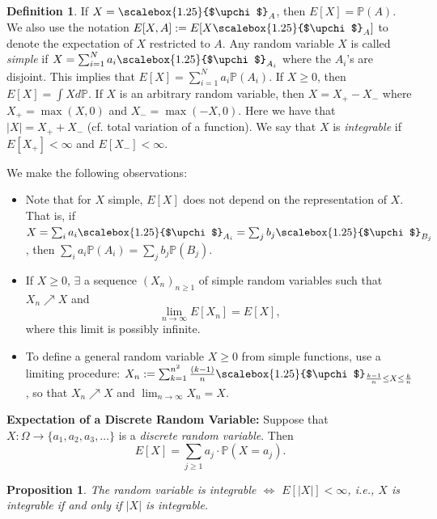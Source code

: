 \documentclass[12pt,reqno]{article}
\renewcommand{\emph}[1]{\textit{#1}}
\theoremstyle{plain}
\newtheorem{prop}[theorem]{Proposition}
\theoremstyle{definition}
\newtheorem{definition}[theorem]{Definition}
\newcommand{\PP}[1]{\ensuremath{\mathbb{P}\left(#1\right)}}
\renewcommand{\chi}{\scalebox{1.25}{$\upchi$}}
\begin{document}
\begin{definition}
If $X = \chi_A$, then $E[X] = \mathbb{P}(A)$. We also use the notation 
$E[X,A] := E[X \chi_A]$ to denote the expectation of $X$ restricted to $A$. 
Any random variable $X$ is 
called \emph{simple} if $X = \sum_{i=1}^N a_i \chi_{A_i}$ where the 
$A_i$'s are disjoint. This implies that 
$E[X] = \sum_{i=1}^N a_i \mathbb{P}(A_i)$. 
If $X \geq 0$, then $E[X] = \int X d\mathbb{P}$. 
If $X$ is an arbitrary random variable, then $X = X_{+} - X_{-}$ where 
$X_{+} = \max(X, 0)$ and $X_{-} = \max(-X, 0)$. Here we have that 
$|X| = X_{+} + X_{-}$ (cf. total variation of a function). 
We say that $X$ is \emph{integrable} if $E[X_{+}] < \infty$ and 
$E[X_{-}] < \infty$. 
\end{definition} 
We make the following observations: 
\begin{itemize} 

\item Note that for $X$ simple, $E[X]$ does not depend on the 
     representation of $X$. That is, if 
     $X = \sum_i a_i \chi_{A_i} = \sum_j b_j \chi_{B_j}$, then 
     $\sum_i a_i \mathbb{P}(A_i) = \sum_j b_j \mathbb{P}(B_j)$. 
\item If $X \geq 0$, $\exists$ a sequence $(X_n)_{n \geq 1}$ of simple 
     random variables such that $X_n \nearrow X$ and 
     \[
     \lim_{n \rightarrow \infty} E[X_n] = E[X], 
     \]
     where this limit is possibly infinite. 
\item To define a general random variable $X \geq 0$ from simple functions, 
     use a limiting procedure: 
     $X_n := \sum_{k=1}^{n^2} \frac{(k-1)}{n} 
      \chi_{\frac{k-1}{n} \leq X \leq \frac{k}{n}}$, so that 
     $X_n \nearrow X$ and $\lim_{n \rightarrow \infty} X_n = X$. 

\end{itemize} 
\textbf{Expectation of a Discrete Random Variable:} Suppose that 
$X: \Omega \rightarrow \{a_1,a_2,a_3,\ldots\}$ is a \emph{discrete random variable}. 
Then 
\[
E[X] = \sum_{j \geq 1} a_j \cdot \PP{X = a_j}. 
\]

\begin{prop}
The random variable is integrable $\iff$ $E[|X|] < \infty$, 
i.e., $X$ is integrable if and only if $|X|$ is integrable. 
\end{prop} 
\end{document}

